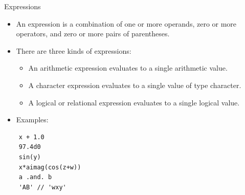 \documentclass[10pt,t]{beamer}
\begin{document}
\begin{frame}[fragile]{Expressions}
  \begin{itemize}
    \item An expression is a combination of one or more operands, zero or more operators, and zero or more pairs of parentheses.
    \item There are three kinds of expressions:
      \begin{itemize}
        \item An arithmetic expression evaluates to a single arithmetic value.
        \item A character expression evaluates to a single value of type character.
        \item A logical or relational expression evaluates to a single logical value.
      \end{itemize}
    \item Examples:
  \end{itemize}
  \begin{lstlisting}
    x + 1.0 
    97.4d0 
    sin(y) 
    x*aimag(cos(z+w)) 
    a .and. b 
    'AB' // 'wxy'
  \end{lstlisting}
\end{frame}
\end{document}
